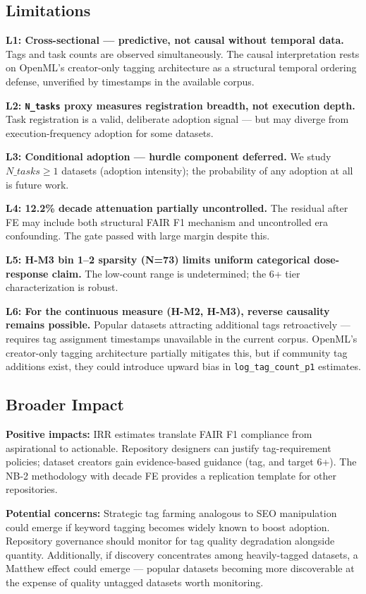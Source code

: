 \subsection{Limitations}

\textbf{L1: Cross-sectional --- predictive, not causal without temporal data.} Tags and task counts are observed simultaneously. The causal interpretation rests on OpenML's creator-only tagging architecture \citep{Vanschoren2014OpenML} as a structural temporal ordering defense, unverified by timestamps in the available corpus.

\textbf{L2: \texttt{N\_tasks} proxy measures registration breadth, not execution depth.} Task registration is a valid, deliberate adoption signal --- but may diverge from execution-frequency adoption for some datasets.

\textbf{L3: Conditional adoption --- hurdle component deferred.} We study $N\_tasks \geq 1$ datasets (adoption intensity); the probability of any adoption at all is future work.

\textbf{L4: 12.2\% decade attenuation partially uncontrolled.} The residual after FE may include both structural FAIR F1 mechanism and uncontrolled era confounding. The gate passed with large margin despite this.

\textbf{L5: H-M3 bin 1--2 sparsity (N=73) limits uniform categorical dose-response claim.} The low-count range is undetermined; the 6+ tier characterization is robust.

\textbf{L6: For the continuous measure (H-M2, H-M3), reverse causality remains possible.} Popular datasets attracting additional tags retroactively --- requires tag assignment timestamps unavailable in the current corpus. OpenML's creator-only tagging architecture partially mitigates this, but if community tag additions exist, they could introduce upward bias in \texttt{log\_tag\_count\_p1} estimates.

\subsection{Broader Impact}

\textbf{Positive impacts:} IRR estimates translate FAIR F1 compliance from aspirational to actionable. Repository designers can justify tag-requirement policies; dataset creators gain evidence-based guidance (tag, and target 6+). The NB-2 methodology with decade FE provides a replication template for other repositories.

\textbf{Potential concerns:} Strategic tag farming analogous to SEO manipulation could emerge if keyword tagging becomes widely known to boost adoption. Repository governance should monitor for tag quality degradation alongside quantity. Additionally, if discovery concentrates among heavily-tagged datasets, a Matthew effect could emerge --- popular datasets becoming more discoverable at the expense of quality untagged datasets worth monitoring.
